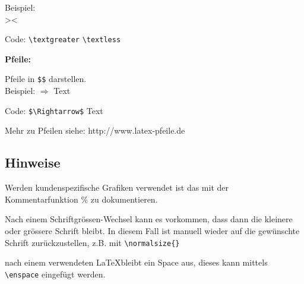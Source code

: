 Beispiel:\\
\textgreater \quad \textless

Code: \verb+\textgreater+ \quad \verb+\textless+

\vspace{\baselineskip}

\textbf{Pfeile:}

Pfeile in \verb+$$+ darstellen.\\

Beispiel: $\Rightarrow$ Text 

Code: \verb+$\Rightarrow$+ Text

\vspace{\baselineskip}

Mehr zu Pfeilen siehe: http://www.latex-pfeile.de






\subsection{Hinweise} 

\begin{compactitem}
	\item Werden kundenspezifische Grafiken verwendet ist das mit der Kommentarfunktion \% zu dokumentieren.
	\item Nach einem Schriftgrössen-Wechsel kann es vorkommen, dass dann die kleinere oder grössere Schrift bleibt. In diesem Fall ist manuell wieder auf die gewünschte Schrift zurückzustellen, z.B. mit \verb+\normalsize{}+
	\item nach einem verwendeten \LaTeX \enspace bleibt ein Space aus, dieses kann mittels \verb+\enspace+ eingefügt werden.

\end{compactitem}


